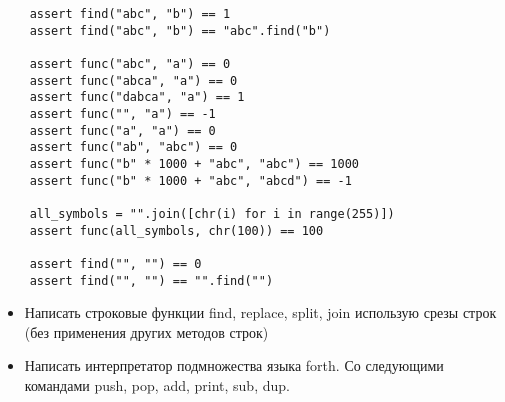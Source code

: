 \documentclass{article}
\begin{document}
\begin{lstlisting}
	assert find("abc", "b") == 1
	assert find("abc", "b") == "abc".find("b")

	assert func("abc", "a") == 0
	assert func("abca", "a") == 0
	assert func("dabca", "a") == 1
	assert func("", "a") == -1
	assert func("a", "a") == 0
	assert func("ab", "abc") == 0
	assert func("b" * 1000 + "abc", "abc") == 1000
	assert func("b" * 1000 + "abc", "abcd") == -1

	all_symbols = "".join([chr(i) for i in range(255)])
	assert func(all_symbols, chr(100)) == 100

	assert find("", "") == 0
	assert find("", "") == "".find("")
\end{lstlisting}

\begin{itemize}
	\item Написать строковые функции find, replace, 
			split, join использую срезы строк 
			(без применения других методов строк)
	\item Написать интерпретатор подмножества языка forth. 
		  Со следующими командами push, pop, add, print, sub, dup.
\end{itemize}
\newpage

\end{document}
